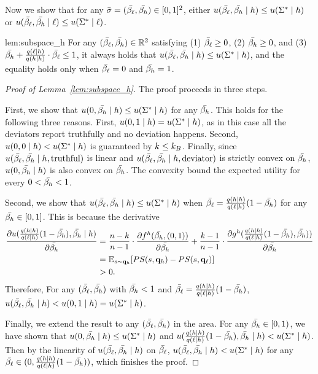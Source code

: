 Now we show that for any $\bar{\sigma} = (\bar{\beta_{\ell}}, \bar{\beta_{h}}) \in [0, 1]^2$, either $ u(\bar{\beta_{\ell}}, \bar{\beta_{h}} \mid h) \le u(\Sigma^* \mid h)$ or $ u(\bar{\beta_{\ell}}, \bar{\beta_{h}} \mid \ell) \le u(\Sigma^* \mid \ell)$. 

\begin{lemnb}{lem:subspace_h}
    For any $(\bar{\beta_{\ell}}, \bar{\beta_{h}}) \in \mathbb{R}^2$ satisfying (1) $\bar{\beta_{\ell}} \ge 0$, (2) $\bar{\beta_{h}} \ge 0$, and (3) $\bar{\beta_{h}} + \frac{q(\ell \mid h)}{q (h \mid h)}\cdot \bar{\beta_{\ell}} \le 1$, it always holds that $ u(\bar{\beta_{\ell}}, \bar{\beta_{h}} \mid h) \le u(\Sigma^* \mid h)$, and the equality holds only when $\bar{\beta_{\ell}} = 0$ and $\bar{\beta_{h}} = 1$. 
\end{lemnb}

\begin{proof}[Proof of Lemma~\ref{lem:subspace_h}]
    The proof proceeds in three steps. 
    
    First, we show that $u(0, \bar{\beta_{h}} \mid h) \le u(\Sigma^* \mid h)$ for any $\bar{\beta_{h}}$. This holds for the following three reasons. First, $u(0, 1 \mid h) =  u(\Sigma^* \mid h)$, as in this case all the deviators report truthfully and no deviation happens. Second, $u(0, 0 \mid h) < u(\Sigma^* \mid h)$ is guaranteed by $k \le k_B$. Finally, since $u(\bar{\beta_{\ell}}, \bar{\beta_{h}} \mid h, \text{truthful})$ is linear and $u(\bar{\beta_{\ell}}, \bar{\beta_{h}} \mid h, \text{deviator})$ is strictly convex on $\bar{\beta_{h}}$, $u(0, \bar{\beta_{h}} \mid h)$ is also convex on $\bar{\beta_{h}}$. The convexity bound the expected utility for every $0 < \bar{\beta_{h}} < 1$. 

    Second, we show that $u(\bar{\beta_{\ell}}, \bar{\beta_{h}} \mid h) \le u(\Sigma^* \mid h)$ when $\bar{\beta_{\ell}} = \frac{q(h\mid h)}{q(\ell \mid h)}(1 - \bar{\beta_{h}})$ for any $\bar{\beta_{h}} \in [0, 1]$. This is because the derivative 
    \begin{align*}
        \frac{\partial u(\frac{q(h\mid h)}{q(\ell \mid h)}(1 - \bar{\beta_{h}}), \bar{\beta_{h}} \mid h)}{\partial \bar{\beta_{h}}} =&\  \frac{n-k}{n - 1} \cdot \frac{\partial f^h(\bar{\beta_{h}}, (0, 1))}{\partial \bar{\beta_{h}}} + \frac{k - 1}{n - 1} \cdot \frac{\partial g^h(\frac{q(h\mid h)}{q(\ell \mid h)}(1 - \bar{\beta_{h}}), \bar{\beta_{h}}))}{\partial \bar{\beta_{h}}}\\
        =&\ \mathbb{E}_{s\sim \mathbf{q}_{h}}[PS(s, \mathbf{q}_{h}) - PS(s, \mathbf{q}_{\ell})]\\
        > &\ 0.
    \end{align*}
    Therefore, For any $(\bar{\beta_{\ell}}, \bar{\beta_{h}})$ with $\bar{\beta_{h}} < 1$ and $\bar{\beta_{\ell}} = \frac{q(h\mid h)}{q(\ell \mid h)}(1 - \bar{\beta_{h}})$, $u(\bar{\beta_{\ell}}, \bar{\beta_{h}} \mid h) < u(0, 1 \mid h) = u(\Sigma^* \mid h)$.

    Finally, we extend the result to any $(\bar{\beta_{\ell}}, \bar{\beta_{h}})$ in the area. For any $\bar{\beta_{h}} \in [0, 1)$, we have shown that  $u(0, \bar{\beta_{h}} \mid h) \le u(\Sigma^*\mid h)$ and $u(\frac{q(h\mid h)}{q(\ell \mid h)}(1 - \bar{\beta_{h}}), \bar{\beta_{h}} \mid h) < u(\Sigma^*\mid h)$. Then by the linearity of $u(\bar{\beta_{\ell}}, \bar{\beta_{h}} \mid h)$ on $\bar{\beta_{\ell}}$, $u(\bar{\beta_{\ell}}, \bar{\beta_{h}} \mid h) < u(\Sigma^* \mid h)$ for any $\bar{\beta_{\ell}} \in (0, \frac{q(h\mid h)}{q(\ell \mid h)}(1 - \bar{\beta_{h}}))$, which finishes the proof. 
\end{proof}

